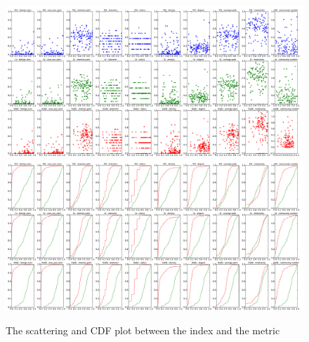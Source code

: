 \documentclass{article}
\begin{document}
\begin{figure}[h]
\centering 
\includegraphics[width=0.97\columnwidth]{index_metric_scatter.pdf}
\includegraphics[width=0.97\columnwidth]{index_metric_cdf.pdf}
\caption{The scattering and CDF plot between the index and the metric}
\label{fig:im_scatter}
\end{figure}
\end{document}
